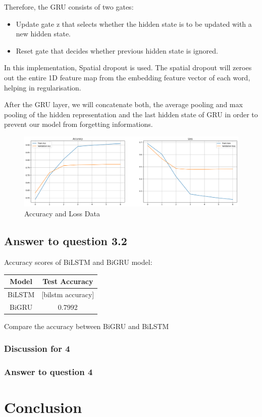 \documentclass{article}
\begin{document}
Therefore, the GRU consists of two gates:
\begin{itemize}
    \item Update gate z that selects whether the hidden state is to be updated with a new hidden state. 
    \item Reset gate that decides whether previous hidden state is ignored. 
\end{itemize}

In this implementation, Spatial dropout is used. The spatial dropout will zeroes out the entire 1D feature map from the embedding feature vector of each word, helping in regularisation. 

After the GRU layer, we will concatenate both, the average pooling and max pooling of the hidden representation and the last hidden state of GRU in order to prevent our model from forgetting informations. 
\begin{figure}
    \centering
    \includegraphics[width=1\linewidth]{BiGRU.png}
    \caption{Accuracy and Loss Data}
    \label{fig:enter-label}
\end{figure}

\subsection*{Answer to question 3.2}
Accuracy scores of BiLSTM and BiGRU model: 
\begin{center}
\begin{tabular}{ | c | c | }
\hline
 Model & Test Accuracy \\
\hline
 BiLSTM & [bilstm accuracy] \\
\hline
 BiGRU & 0.7992 \\
\hline
\end{tabular}
\end{center}

Compare the accuracy between BiGRU and BiLSTM

\subsubsection*{Discussion for 4}

\subsubsection*{Answer to question 4}

\section*{Conclusion}
\end{document}
